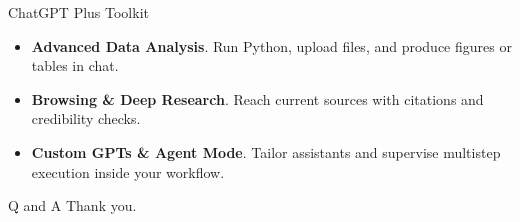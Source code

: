 \documentclass[aspectratio=169,professionalfonts]{beamer}
\newcommand{\feature}[1]{\textbf{#1}}
\begin{document}
\begin{frame}{ChatGPT Plus Toolkit}
  \begin{itemize}
    \item \feature{Advanced Data Analysis}. Run Python, upload files, and produce figures or tables in chat.
    \item \feature{Browsing \& Deep Research}. Reach current sources with citations and credibility checks.
    \item \feature{Custom GPTs \& Agent Mode}. Tailor assistants and supervise multistep execution inside your workflow.
  \end{itemize}
\end{frame}

\begin{frame}{Q and A}
  \centering Thank you.
\end{frame}
\end{document}
